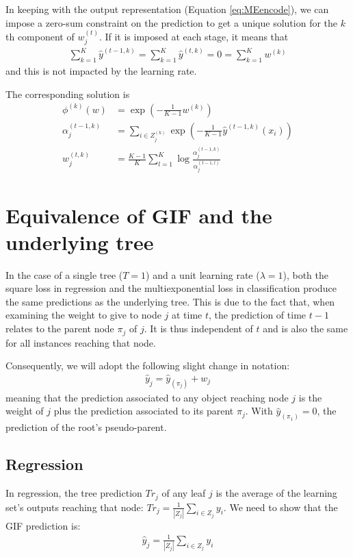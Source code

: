 \documentclass{article}
\begin{document}
In keeping with the output representation (Equation \ref{eq:MEencode}), we can 
impose a zero-sum constraint on the prediction to get a unique solution for the 
$k$th component of $w_j^{(t)}$. If it is imposed at each stage, it means that
\begin{align}\label{eq:MEzeroSum}
\sum_{k=1}^{K} \hat{y}^{(t-1, k)} = \sum_{k=1}^{K} 
\hat{y}^{(t, k)} = 0 = \sum_{k=1}^{K} w^{(k)}
\end{align}
and this is not impacted by the learning rate. 

The corresponding solution is
\begin{align}
\phi^{(k)}(w) &= \exp \left(-\frac{1}{K-1} w^{(k)}\right)\\ 
\label{eq:MEClsErrZS}
\alpha_j^{(t-1, k)} &= \sum_{i \in Z_j^{(k)}} \exp \left( -\frac{1}{K-1} 
\hat{y}^{(t-1, k)}(x_i) \right) \\ \label{eq:MEsolution}
w_j^{(t,k)} &= \frac{K-1}{K}  \sum_{l=1}^{K} \log \frac{\alpha_j^{(t-1, 
k)}}{\alpha_j^{(t-1, l)}} 
\end{align}









\section{Equivalence of GIF and the underlying tree}\label{app:Equiv}
In the case of a single tree ($T=1$) and a unit learning rate ($\lambda=1$), 
both the square loss in regression and the multiexponential loss in 
classification produce the same predictions as the underlying tree. 
This is due to the fact that, when examining the weight to give to node $j$ at 
time $t$, the prediction of time $t-1$ relates to the parent node $\pi_j$ of 
$j$. It is thus independent of $t$ and is also the same for all instances 
reaching that node. 

Consequently, we will adopt the following slight change in notation:
\begin{align}
\hat{y}_j = \hat{y}_{(\pi_j)} + w_j
\end{align}
meaning that the prediction associated to any object reaching node $j$ is the 
weight of $j$ plus the prediction associated to its parent $\pi_j$. With  
$\hat{y}_{(\pi_1)} = 0$, the prediction of the root's pseudo-parent.

\subsection{Regression}
In regression, the tree prediction $Tr_j$ of any leaf $j$ is the average of the 
learning set's outputs reaching that node: $Tr_j = \frac{1}{|Z_j|}\sum_{i \in 
Z_j} y_i$. We need to show that the GIF prediction is:
\begin{align}\label{eq:EquivL2Cond}
\hat{y}_{j} = \frac{1}{|Z_j|}\sum_{i \in Z_j} y_i
\end{align}
\end{document}
